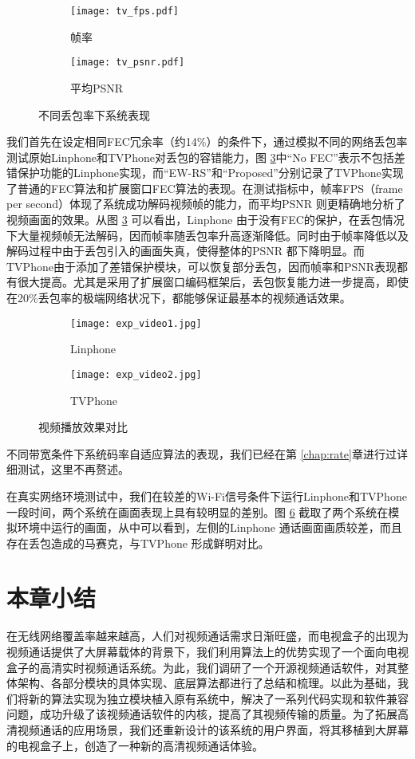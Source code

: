 \begin{figure}[htbp]
  \begin{subfigure}[b]{0.5\textwidth}
    \centering
    \texttt{[image: tv\_fps.pdf]}
    \caption{帧率}
    \label{pic:tv_fps}
  \end{subfigure}
  \begin{subfigure}[b]{0.5\textwidth}
    \centering
    \texttt{[image: tv\_psnr.pdf]}
    \caption{平均PSNR}
    \label{pic:tv_psnr}
  \end{subfigure}
  \caption{不同丢包率下系统表现}
  \label{fig:tv_loss}
\end{figure}

我们首先在设定相同FEC冗余率（约14\%）的条件下，通过模拟不同的网络丢包率测试原始Linphone和TVPhone对丢包的容错能力，图 \ref{fig:tv_loss}中``No FEC''表示不包括差错保护功能的Linphone实现，而``EW-RS''和``Proposed''分别记录了TVPhone实现了普通的FEC算法和扩展窗口FEC算法的表现。在测试指标中，帧率FPS（frame per second）体现了系统成功解码视频帧的能力，而平均PSNR 则更精确地分析了视频画面的效果。从图 \ref{fig:tv_loss} 可以看出，Linphone 由于没有FEC的保护，在丢包情况下大量视频帧无法解码，因而帧率随丢包率升高逐渐降低。同时由于帧率降低以及解码过程中由于丢包引入的画面失真，使得整体的PSNR 都下降明显。而TVPhone由于添加了差错保护模块，可以恢复部分丢包，因而帧率和PSNR表现都有很大提高。尤其是采用了扩展窗口编码框架后，丢包恢复能力进一步提高，即使在20\%丢包率的极端网络状况下，都能够保证最基本的视频通话效果。

\begin{figure}[htbp]
  \begin{subfigure}[b]{0.5\textwidth}
    \centering
    \texttt{[image: exp\_video1.jpg]}
    \caption{Linphone}
    \label{pic:tv_fps}
  \end{subfigure}
  \begin{subfigure}[b]{0.5\textwidth}
    \centering
    \texttt{[image: exp\_video2.jpg]}
    \caption{TVPhone}
    \label{pic:tv_psnr}
  \end{subfigure}
  \caption{视频播放效果对比}
  \label{fig:exp_video}
\end{figure}

不同带宽条件下系统码率自适应算法的表现，我们已经在第 \ref{chap:rate}章进行过详细测试，这里不再赘述。

在真实网络环境测试中，我们在较差的Wi-Fi信号条件下运行Linphone和TVPhone一段时间，两个系统在画面表现上具有较明显的差别。图 \ref{fig:exp_video} 截取了两个系统在模拟环境中运行的画面，从中可以看到，左侧的Linphone 通话画面画质较差，而且存在丢包造成的马赛克，与TVPhone 形成鲜明对比。

\section{本章小结}
在无线网络覆盖率越来越高，人们对视频通话需求日渐旺盛，而电视盒子的出现为视频通话提供了大屏幕载体的背景下，我们利用算法上的优势实现了一个面向电视盒子的高清实时视频通话系统。为此，我们调研了一个开源视频通话软件，对其整体架构、各部分模块的具体实现、底层算法都进行了总结和梳理。以此为基础，我们将新的算法实现为独立模块植入原有系统中，解决了一系列代码实现和软件兼容问题，成功升级了该视频通话软件的内核，提高了其视频传输的质量。为了拓展高清视频通话的应用场景，我们还重新设计的该系统的用户界面，将其移植到大屏幕的电视盒子上，创造了一种新的高清视频通话体验。
